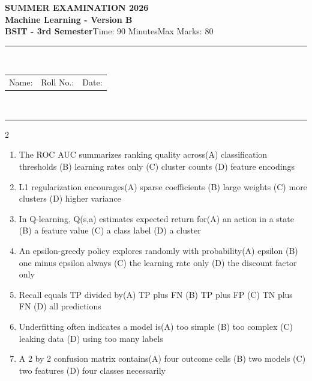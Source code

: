 \documentclass[a4paper]{article}
\makeatletter
\newcommand{\examheader}{%
\begin{center}\textbf{\large SUMMER EXAMINATION 2026}\\[-1pt]
\textbf{\normalsize Machine Learning - Version B}\\[-1pt]
\textbf{BSIT - 3rd Semester}\quad Time: 90 Minutes\quad Max Marks: 80\\[-1pt]
\textcolor{black!65}{\rule{\linewidth}{0.45pt}}\\[-2pt]
\begin{tabularx}{\linewidth}{@{}X X X@{}}Name: \hrulefill & Roll No.: \hrulefill & Date: \hrulefill\end{tabularx}\\[-1pt]
\textcolor{black!65}{\rule{\linewidth}{0.45pt}}\end{center}}
\makeatother
\begin{document}
\examheader
\raggedcolumns
\begin{multicols*}{2}
\fontsize{8.5}{10}\selectfont
\begin{enumerate}
\item The ROC AUC summarizes ranking quality across\newline\hspace*{0.6em}(A) classification thresholds \quad (B) learning rates only \newline\hspace*{0.6em}(C) cluster counts \quad (D) feature encodings
\item L1 regularization encourages\newline\hspace*{0.6em}(A) sparse coefficients \quad (B) large weights \newline\hspace*{0.6em}(C) more clusters \quad (D) higher variance
\item In Q-learning, Q(s,a) estimates expected return for\newline\hspace*{0.6em}(A) an action in a state \quad (B) a feature value \newline\hspace*{0.6em}(C) a class label \quad (D) a cluster
\item An epsilon-greedy policy explores randomly with probability\newline\hspace*{0.6em}(A) epsilon \quad (B) one minus epsilon always \newline\hspace*{0.6em}(C) the learning rate only \quad (D) the discount factor only
\item Recall equals TP divided by\newline\hspace*{0.6em}(A) TP plus FN \quad (B) TP plus FP \newline\hspace*{0.6em}(C) TN plus FN \quad (D) all predictions
\item Underfitting often indicates a model is\newline\hspace*{0.6em}(A) too simple \quad (B) too complex \newline\hspace*{0.6em}(C) leaking data \quad (D) using too many labels
\item A 2 by 2 confusion matrix contains\newline\hspace*{0.6em}(A) four outcome cells \quad (B) two models \newline\hspace*{0.6em}(C) two features \quad (D) four classes necessarily

\end{enumerate}
\end{multicols*}
\end{document}
